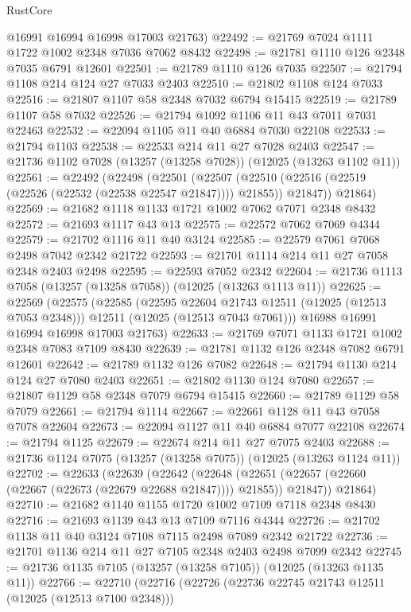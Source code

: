 \begin{lexlean}{RustCore}
\begin{coremodule}
      @16991
      @16994
      @16998
      @17003
      @21763)
@22492 := @21769 @7024 @1111 @1722 @1002 @2348 @7036 @7062 @8432
@22498 := @21781 @1110 @126 @2348 @7035 @6791 @12601
@22501 := @21789 @1110 @126 @7035
@22507 := @21794 @1108 @214 @124 @27 @7033 @2403
@22510 := @21802 @1108 @124 @7033
@22516 := @21807 @1107 @58 @2348 @7032 @6794 @15415
@22519 := @21789 @1107 @58 @7032
@22526 := @21794 @1092 @1106 @11 @43 @7011 @7031 @22463
@22532 := @22094 @1105 @11 @40 @6884 @7030 @22108
@22533 := @21794 @1103
@22538 := @22533 @214 @11 @27 @7028 @2403
@22547 := @21736 @1102 @7028 (@13257 (@13258 @7028)) (@12025 (@13263 @1102 @11))
@22561 := @22492
    (@22498
      (@22501
        (@22507 (@22510 (@22516 (@22519 (@22526 (@22532 (@22538 @22547 @21847)))) @21855)) @21847))
      @21864)
@22569 := @21682 @1118 @1133 @1721 @1002 @7062 @7071 @2348 @8432
@22572 := @21693 @1117 @43 @13
@22575 := @22572 @7062 @7069 @4344
@22579 := @21702 @1116 @11 @40 @3124
@22585 := @22579 @7061 @7068 @2498 @7042 @2342 @21722
@22593 := @21701 @1114 @214 @11 @27 @7058 @2348 @2403 @2498
@22595 := @22593 @7052 @2342
@22604 := @21736 @1113 @7058 (@13257 (@13258 @7058)) (@12025 (@13263 @1113 @11))
@22625 := @22569
    (@22575
      (@22585
        (@22595 @22604 @21743 @12511 (@12025 (@12513 @7053 @2348)))
        @12511
        (@12025 (@12513 @7043 @7061)))
      @16988
      @16991
      @16994
      @16998
      @17003
      @21763)
@22633 := @21769 @7071 @1133 @1721 @1002 @2348 @7083 @7109 @8430
@22639 := @21781 @1132 @126 @2348 @7082 @6791 @12601
@22642 := @21789 @1132 @126 @7082
@22648 := @21794 @1130 @214 @124 @27 @7080 @2403
@22651 := @21802 @1130 @124 @7080
@22657 := @21807 @1129 @58 @2348 @7079 @6794 @15415
@22660 := @21789 @1129 @58 @7079
@22661 := @21794 @1114
@22667 := @22661 @1128 @11 @43 @7058 @7078 @22604
@22673 := @22094 @1127 @11 @40 @6884 @7077 @22108
@22674 := @21794 @1125
@22679 := @22674 @214 @11 @27 @7075 @2403
@22688 := @21736 @1124 @7075 (@13257 (@13258 @7075)) (@12025 (@13263 @1124 @11))
@22702 := @22633
    (@22639
      (@22642
        (@22648 (@22651 (@22657 (@22660 (@22667 (@22673 (@22679 @22688 @21847)))) @21855)) @21847))
      @21864)
@22710 := @21682 @1140 @1155 @1720 @1002 @7109 @7118 @2348 @8430
@22716 := @21693 @1139 @43 @13 @7109 @7116 @4344
@22726 := @21702 @1138 @11 @40 @3124 @7108 @7115 @2498 @7089 @2342 @21722
@22736 := @21701 @1136 @214 @11 @27 @7105 @2348 @2403 @2498 @7099 @2342
@22745 := @21736 @1135 @7105 (@13257 (@13258 @7105)) (@12025 (@13263 @1135 @11))
@22766 := @22710
    (@22716
      (@22726
        (@22736 @22745 @21743 @12511 (@12025 (@12513 @7100 @2348)))

\end{coremodule}
\end{lexlean}

